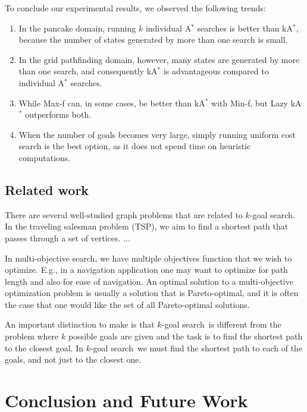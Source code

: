 \documentclass{aicom2e}
\newcommand{\kgs}{$k$-goal search}
\newcommand{\astar}{A$^*$}
\newcommand{\kastar}{kA$^*$}
\newcommand{\minf}{Min-f}
\newcommand{\maxf}{Max-f}
\begin{document}
To conclude our experimental results, we observed the following trends:
\begin{enumerate}
	\item In the pancake domain, running $k$ individual \astar{} searches is better than \kastar{}, because the number of states generated by more than one search is small.
	\item In the grid pathfinding domain, however, many states are generated by more than one search, and consequently \kastar{} is advantageous compared to individual \astar{} searches. 
	\item While \maxf{} can, in some cases, be better than \kastar{} with \minf{}, but Lazy \kastar{} outperforms both. 
	\item When the number of goals becomes very large, simply running uniform cost search is the best option, as it does not spend time on heuristic computations. 
\end{enumerate}






\subsection*{Related work}

There are several well-studied graph problems that are related to $k$-goal search. In the traveling salesman problem (TSP), we aim to find a shortest path that passes through a set of vertices. 
...

In multi-objective search, we have multiple objectives function that we wish to optimize. E.g., in a navigation application one may want to optimize for path length and also for ease of navigation. An optimal 
solution to a multi-objective optimization problem is usually a solution that is Pareto-optimal, and it is often the case that one would like the set of all Pareto-optimal solutions. 


An important distinction to make is that \kgs\ is different from the problem where $k$ possible goals are given and the task is to find the shortest path to the closest goal. In \kgs\ we must find the shortest path to each of the goals, and not just to the closest one. 



\section{Conclusion and Future Work}
\end{document}
